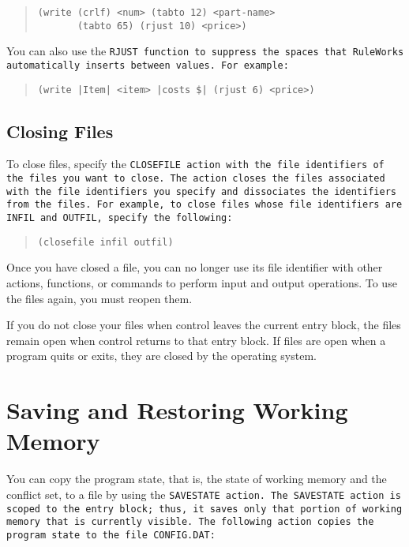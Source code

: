 \begin{quote}
\begin{verbatim}
(write (crlf) <num> (tabto 12) <part-name> 
       (tabto 65) (rjust 10) <price>)
\end{verbatim}
\end{quote}

You can also use the \tt{RJUST} function to suppress the spaces that
RuleWorks automatically inserts between values. For example:

\begin{quote}
\begin{verbatim}
(write |Item| <item> |costs $| (rjust 6) <price>)
\end{verbatim}
\end{quote}

\subsection{Closing Files}

To close files, specify the \tt{CLOSEFILE} action with the file
identifiers of the files you want to close. The action closes the
files associated with the file identifiers you specify and dissociates
the identifiers from the files. For example, to close files whose file
identifiers are \tt{INFIL} and \tt{OUTFIL}, specify the following:

\begin{quote}
\begin{verbatim}
(closefile infil outfil)
\end{verbatim}
\end{quote}

Once you have closed a file, you can no longer use its file identifier
with other actions, functions, or commands to perform input and output
operations. To use the files again, you must reopen them.

If you do not close your files when control leaves the current entry
block, the files remain open when control returns to that entry
block. If files are open when a program quits or exits, they are
closed by the operating system.

\section{Saving and Restoring Working Memory}

You can copy the program state, that is, the state of working memory
and the conflict set, to a file by using the \tt{SAVESTATE}
action. The \tt{SAVESTATE} action is scoped to the entry block; thus,
it saves only that portion of working memory that is currently
visible. The following action copies the program state to the file
\tt{CONFIG.DAT}:

